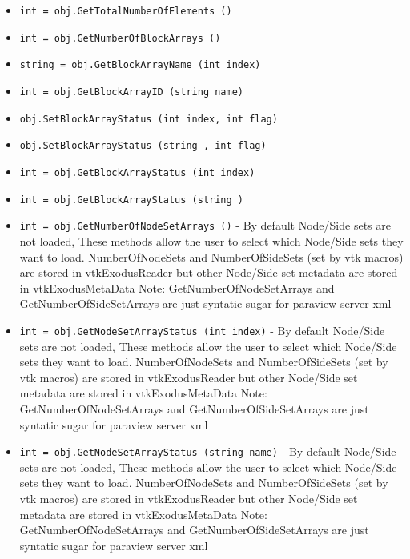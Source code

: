 \begin{itemize}
\item  \verb|int = obj.GetTotalNumberOfElements ()|

\item  \verb|int = obj.GetNumberOfBlockArrays ()|

\item  \verb|string = obj.GetBlockArrayName (int index)|

\item  \verb|int = obj.GetBlockArrayID (string name)|

\item  \verb|obj.SetBlockArrayStatus (int index, int flag)|

\item  \verb|obj.SetBlockArrayStatus (string , int flag)|

\item  \verb|int = obj.GetBlockArrayStatus (int index)|

\item  \verb|int = obj.GetBlockArrayStatus (string )|

\item  \verb|int = obj.GetNumberOfNodeSetArrays ()| -  By default Node/Side sets are not loaded, These methods allow the user to
 select which Node/Side sets they want to load. NumberOfNodeSets and
 NumberOfSideSets (set by vtk macros) are stored in vtkExodusReader 
 but other Node/Side set metadata are stored in vtkExodusMetaData
 Note: GetNumberOfNodeSetArrays and GetNumberOfSideSetArrays are
 just syntatic sugar for paraview server xml

\item  \verb|int = obj.GetNodeSetArrayStatus (int index)| -  By default Node/Side sets are not loaded, These methods allow the user to
 select which Node/Side sets they want to load. NumberOfNodeSets and
 NumberOfSideSets (set by vtk macros) are stored in vtkExodusReader 
 but other Node/Side set metadata are stored in vtkExodusMetaData
 Note: GetNumberOfNodeSetArrays and GetNumberOfSideSetArrays are
 just syntatic sugar for paraview server xml

\item  \verb|int = obj.GetNodeSetArrayStatus (string name)| -  By default Node/Side sets are not loaded, These methods allow the user to
 select which Node/Side sets they want to load. NumberOfNodeSets and
 NumberOfSideSets (set by vtk macros) are stored in vtkExodusReader 
 but other Node/Side set metadata are stored in vtkExodusMetaData
 Note: GetNumberOfNodeSetArrays and GetNumberOfSideSetArrays are
 just syntatic sugar for paraview server xml


\end{itemize}
